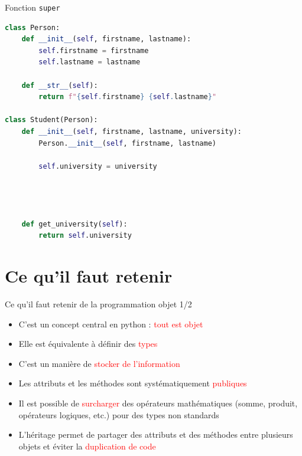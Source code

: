 \documentclass[10pt]{beamer}
\begin{document}
\begin{frame}[fragile]{Fonction \texttt{super}}
\begin{lstlisting}[language=python, numbers=none, morekeywords={super}]
class Person:
    def __init__(self, firstname, lastname):
        self.firstname = firstname
        self.lastname = lastname

    def __str__(self):
        return f"{self.firstname} {self.lastname}"

class Student(Person):
    def __init__(self, firstname, lastname, university):
        Person.__init__(self, firstname, lastname)

        self.university = university        
    



    def get_university(self):
        return self.university
\end{lstlisting}
  \end{frame}


\section{Ce qu'il faut retenir}

\begin{frame}{Ce qu'il faut retenir de la programmation objet 1/2}

  \begin{itemize}
    \item C'est un concept central en python : \textcolor{red}{tout est objet}
    \item Elle est équivalente à définir des \textcolor{red}{types}
    \item C'est un manière de \textcolor{red}{stocker de l'information}
    \item Les attributs et les méthodes sont systématiquement \textcolor{red}{publiques}
    \item Il est possible de \textcolor{red}{surcharger} des opérateurs mathématiques (somme, produit, opérateurs logiques, etc.) pour des types non standards
    \item L'héritage permet de partager des attributs et des méthodes entre plusieurs objets et éviter la \textcolor{red}{duplication de code}
  \end{itemize}
\end{frame}
\end{document}
